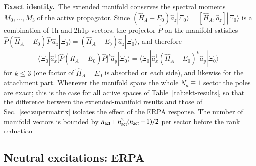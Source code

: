 \documentclass[aip,jcp,reprint,noshowkeys,superscriptaddress]{revtex4-1}
\newcommand{\Exact}{\textbf{Exact identity.}\ }
\begin{document}
\Exact The extended manifold conserves the spectral moments
$M_0,\ldots,M_3$ of the active propagator.  Since
$(\hat H_A-E_0)\hat a_z|\Xi_0\rangle=[\hat H_A,\hat a_z]|\Xi_0\rangle$ is a
combination of 1h and 2h1p vectors, the projector $\hat P$ on the manifold
satisfies
$\hat P(\hat H_A-E_0)\hat P\,\hat a_z|\Xi_0\rangle=(\hat H_A-E_0)\hat a_z|\Xi_0\rangle$,
and therefore
\begin{equation}
  \langle\Xi_0|\hat a_x^\dagger\bigl[\hat P(\hat H_A-E_0)\hat P\bigr]^{k}\hat a_y|\Xi_0\rangle
  =\langle\Xi_0|\hat a_x^\dagger(\hat H_A-E_0)^{k}\hat a_y|\Xi_0\rangle
  \label{eq:ekt2-moments}
\end{equation}
for $k\le3$ (one factor of $\hat H_A-E_0$ is absorbed on each side), and
likewise for the attachment part.  Whenever the manifold spans the whole
$N_a\mp1$ sector the poles are exact; this is the case for all active
spaces of Table~\ref{tab:ekt-results}, so that the difference between the
extended-manifold results and those of Sec.~\ref{sec:supermatrix} isolates
the effect of the ERPA response.  The number of manifold vectors is
bounded by $n_{\rm act}+n_{\rm act}^{2}(n_{\rm act}-1)/2$ per sector before
the rank reduction.

\subsection{Neutral excitations: ERPA}
\label{sec:erpa}
\end{document}
